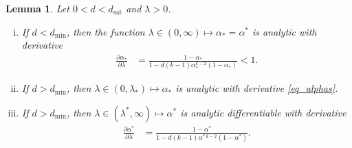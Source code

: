 \documentclass[10pt,reqno]{amsart}
\numberwithin{equation}{section}
\newcommand\dmin{d_{\mathrm{min}}}
\newcommand\dsat{d_{\mathrm{sat}}}
\newtheorem{lemma}[definition]{Lemma}
\begin{document}
\begin{lemma}\label{lem_alphas}
	Let $0<d<\dsat$ and $\lambda>0$.
	\begin{enumerate}[(i)]
		\item If $d<\dmin$, then the function $\lambda\in(0,\infty)\mapsto\alpha_*=\alpha^*$ is analytic with derivative
		\begin{align}\label{eq_alphas}
	\frac{\partial\alpha_*}{\partial \lambda}&=\frac{1- \alpha_*}{1-d(k-1)\alpha_*^{k-2}(1-\alpha_*)}<1.
	\end{align}
		\item If $d>\dmin$, then $\lambda\in(0,\lambda_*)\mapsto\alpha_*$ is analytic with derivative \eqref{eq_alphas}.
\item If $d>\dmin$, then $\lambda\in(\lambda^*,\infty)\mapsto\alpha^*$ is analytic differentiable with derivative
\begin{align*}
	\frac{\partial\alpha^*}{\partial \lambda}&=\frac{1- \alpha^*}{1-d(k-1)\alpha^{*\,k-2}(1-\alpha^*)}.
	\end{align*}
	\end{enumerate}
\end{lemma}
\end{document}

